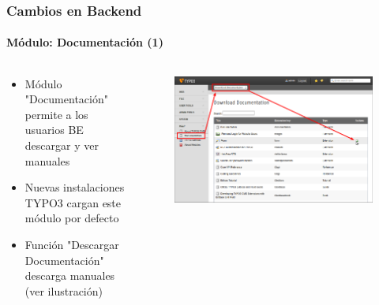 \begin{frame}[fragile]
	\frametitle{Cambios en Backend}
	\framesubtitle{Módulo: Documentación (1)}

	\begin{columns}[T]

		\begin{column}{.5\textwidth}
			\begin{itemize}
				\item Módulo "Documentación" permite a los usuarios BE descargar y ver manuales
				\item Nuevas instalaciones TYPO3 cargan este módulo por defecto
				\item Función "Descargar Documentación" descarga manuales (ver ilustración)
			\end{itemize}
		\end{column}

		\begin{column}{.5\textwidth}
			\begin{figure}\vspace*{-0.4cm}
				\includegraphics[width=1\linewidth]{Images/BackendChanges/DownloadDocumentation.png}
			\end{figure}
		\end{column}

	\end{columns}

\end{frame}


